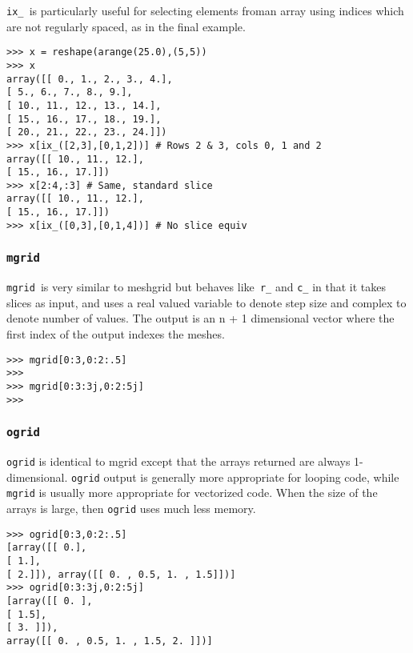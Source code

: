 \documentclass[KSmain.tex]{subfiles}
\begin{document}
\noindent \texttt{ix\_ }is particularly useful for selecting elements froman array using indices which are not regularly
spaced, as in the final example.
\begin{framed}
\begin{verbatim}
>>> x = reshape(arange(25.0),(5,5))
>>> x
array([[ 0., 1., 2., 3., 4.],
[ 5., 6., 7., 8., 9.],
[ 10., 11., 12., 13., 14.],
[ 15., 16., 17., 18., 19.],
[ 20., 21., 22., 23., 24.]])
>>> x[ix_([2,3],[0,1,2])] # Rows 2 & 3, cols 0, 1 and 2
array([[ 10., 11., 12.],
[ 15., 16., 17.]])
>>> x[2:4,:3] # Same, standard slice
array([[ 10., 11., 12.],
[ 15., 16., 17.]])
>>> x[ix_([0,3],[0,1,4])] # No slice equiv
\end{verbatim}
\end{framed}
\subsubsection{\texttt{mgrid}}
\texttt{mgrid }is very similar to meshgrid but behaves like\texttt{ r\_} and \texttt{c\_} in that it takes slices as input, and uses a
real valued variable to denote step size and complex to denote number of values. The output is an n + 1
dimensional vector where the first index of the output indexes the meshes.
\begin{framed}
\begin{verbatim}
>>> mgrid[0:3,0:2:.5]
>>>
>>> mgrid[0:3:3j,0:2:5j]
>>>
\end{verbatim}
\end{framed}

\subsubsection{\texttt{ogrid}}
\texttt{ogrid} is identical to mgrid except that the arrays returned are always 1-dimensional. \texttt{ogrid} output is generally
more appropriate for looping code, while \texttt{mgrid} is usually more appropriate for vectorized code.
When the size of the arrays is large, then \texttt{ogrid} uses much less memory.
\begin{framed}
\begin{verbatim}
>>> ogrid[0:3,0:2:.5]
[array([[ 0.],
[ 1.],
[ 2.]]), array([[ 0. , 0.5, 1. , 1.5]])]
>>> ogrid[0:3:3j,0:2:5j]
[array([[ 0. ],
[ 1.5],
[ 3. ]]),
array([[ 0. , 0.5, 1. , 1.5, 2. ]])]
\end{verbatim}
\end{framed}
\end{document}
